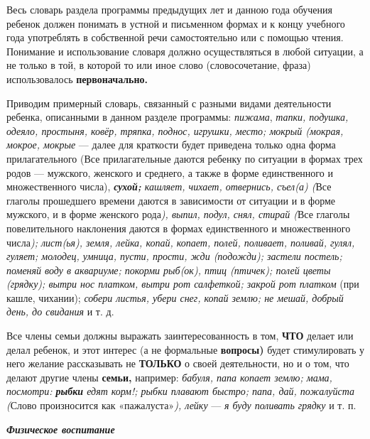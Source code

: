 \documentclass{book}
\renewcommand{\emph}[1]{\textit{#1}}
\begin{document}
Весь словарь раздела программы предыдущих лет и данною года обучения
ребенок должен понимать в устной и письменном формах и к концу учебного
года употреблять в собственной речи самостоятельно или с помощью чтения.
Понимание и использование словаря должно осуществляться в любой
ситуации, а не только в той, в которой то или иное слово
(словосочетание, фраза) использовалось \textbf{первоначально.}

Приводим примерный словарь, связанный с разными видами деятельности
ребенка, описанными в данном разделе программы: \emph{пижама},
\emph{тапки, подушка, одеяло, простыня, ковёр, тряпка, поднос, игрушки,
место; мокрый (мокрая, мокрое, мокрые} --- далее для краткости будет
приведена только одна форма прилагательного (Все прилагательные даются
ребенку по ситуации в формах трех родов --- мужского, женского и
среднего, а также в форме единственного и множественного числа),
\emph{\textbf{сухой;} кашляет, чихает, отвернись, съел(а) (}Все глаголы
прошедшего времени даются в зависимости от ситуации и в форме мужского,
и в форме женского рода\emph{), выпил, подул, снял, стирай (}Все глаголы
повелительного наклонения даются в формах единственного и множественного
числа\emph{); лист(ья), земля, лейка, копай, копает, полей, поливает,
поливай, гулял, гуляет; молодец, умница, пусти, прости, жди (подожди);
застели постель; поменяй воду в аквариуме; покорми рыб(ок), птиц
(птичек); полей цветы (грядку); вытри нос платком, вытри рот салфеткой;
закрой рот платком} (при кашле, чихании); \emph{собери листья, убери
снег, копай землю; не мешай, добрый день, до свидания} и т. д.

Все члены семьи должны выражать заинтересованность в том, \textbf{ЧТО}
делает или делал ребенок, и этот интерес (а не формальные
\textbf{вопросы)} будет стимулировать у него желание рассказывать не
\textbf{ТОЛЬКО} о своей деятельности, но и о том, что делают другие
члены \textbf{семьи,} например: \emph{бабуля, папа копает землю; мама,
посмотри: \textbf{рыбки} едят корм!; рыбки плавают быстро; папа, дай,
пожалуйста (}Слово произносится как «пажалуста»\emph{), лейку} ---
\emph{я буду поливать грядку} и т. п.

\emph{\textbf{Физическое воспитание}}
\end{document}

